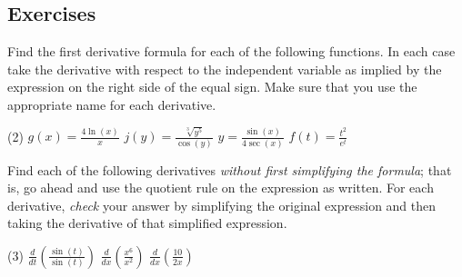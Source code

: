 \documentclass[10pt,oneside,]{book}
\theoremstyle{plain}
\theoremstyle{definition}
\numberwithin{equation}{section}
\newcommand{\fe}[2]{#1\mathopen{}\left(#2\right)\mathclose{}}
\newcommand{\lzoo}[2]{{\frac{d}{d#1}}{\left(#2\right)}}
\begin{document}
\subsection[Exercises]{Exercises}\label{exercises-38}
Find the first derivative formula for each of the following functions.  In each case take the derivative with respect to the independent variable as implied by the expression on the right side of the equal sign.  Make sure that you use the appropriate name for each derivative.%
\par
\begin{exercisegroup}(2)
\exercise[1.]\hypertarget{exercise-378}{\null}\(\fe{g}{x}=\frac{4\fe{\ln}{x}}{x}\)%
\exercise[2.]\hypertarget{exercise-379}{\null}\(\fe{j}{y}=\frac{\sqrt[3]{y^5}}{\fe{\cos}{y}}\)%
\exercise[3.]\hypertarget{exercise-380}{\null}\(y=\frac{\fe{\sin}{x}}{4\fe{\sec}{x}}\)%
\exercise[4.]\hypertarget{exercise-381}{\null}\(\fe{f}{t}=\frac{t^2}{e^t}\)%
\end{exercisegroup}
\par\smallskip\noindent
Find each of the following derivatives \emph{without first simplifying the formula}; that is, go ahead and use the quotient rule on the expression as written. For each derivative, \emph{check} your answer by simplifying the original expression and then taking the derivative of that simplified expression.%
\par
\begin{exercisegroup}(3)
\exercise[5.]\hypertarget{unsimplified-quotient-first}{\null}\(\lzoo{t}{\frac{\fe{\sin}{t}}{\fe{\sin}{t}}}\)%
\exercise[6.]\hypertarget{exercise-383}{\null}\(\lzoo{x}{\frac{x^6}{x^2}}\)%
\exercise[7.]\hypertarget{unsimplified-quotient-last}{\null}\(\lzoo{x}{\frac{10}{2x}}\)%
\end{exercisegroup}
\par\smallskip\noindent
\typeout{************************************************}
\typeout{************************************************}
\end{document}
